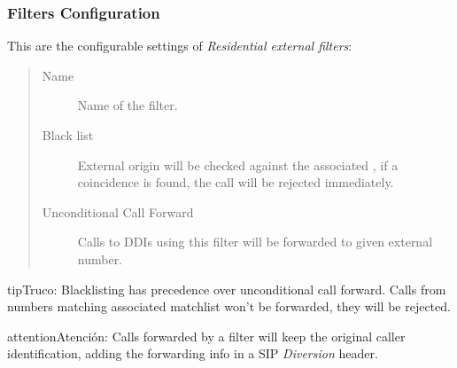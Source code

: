 \documentclass[letterpaper,10pt,spanish]{sphinxmanual}
\begin{document}
\subsubsection{Filters Configuration}
\label{administration_portal/client/residential/external_call_filters:filters-configuration}
This are the configurable settings of \emph{Residential external filters}:
\begin{quote}
\begin{description}
\item[{Name}] \leavevmode
Name of the filter.

\item[{Black list}] \leavevmode
External origin will be checked against the associated {\hyperref[administration_portal/client/vpbx/routing_tools/match_lists:match\string-lists]{}},
if a coincidence is found, the call will be rejected immediately.

\item[{Unconditional Call Forward}] \leavevmode
Calls to DDIs using this filter will be forwarded to given external number.

\end{description}
\end{quote}

\begin{notice}{tip}{Truco:}
Blacklisting has precedence over unconditional call forward. Calls from numbers
matching associated matchlist won't be forwarded, they will be rejected.
\end{notice}

\begin{notice}{attention}{Atención:}
Calls forwarded by a filter will keep the original
caller identification, adding the forwarding info in a SIP
\emph{Diversion} header.
\end{notice}
\end{document}
